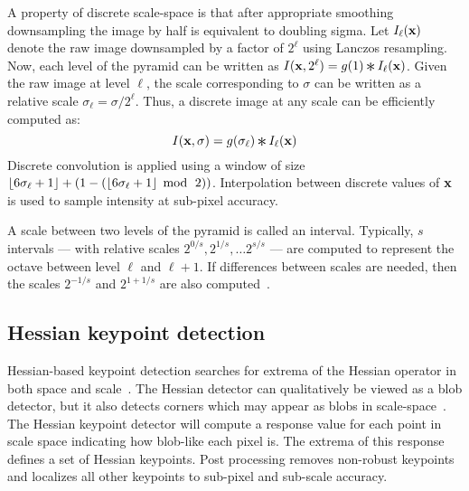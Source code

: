             A property of discrete scale-space is that after appropriate smoothing downsampling the image by half
            is equivalent to doubling sigma. Let
            $I_\ell(\mathbf{x})$ %
            denote the raw image downsampled by a factor of $2^{\ell}$ using Lanczos resampling. Now, each level of
            the pyramid can be written as %
            $\img(\pt, 2^\ell) = g( 1 ) \conv \img_\ell(\pt)$. 
            Given the raw image at level $\ell$, the scale
            corresponding to $\sigma$ can be written as a relative scale
            $\sigma_\ell = \sigma / 2^\ell$.
            Thus, a discrete image at any scale can be efficiently computed as:
            \begin{equation}
                \img(\pt, \sigma) =
                    g(\sigma_\ell) \conv \img_\ell(\pt)
            \end{equation}
            Discrete convolution is applied using a window of size
              $\left\lfloor{} 6\sigma_\ell + 1 \right\rfloor + (1 -
              (\left\lfloor{} 6\sigma_\ell + 1 \right\rfloor\; \operatorname{mod}{} \;\,2))$.
            Interpolation between discrete values of $\mathbf{x}$ is used to
              sample intensity at sub-pixel accuracy.

            A scale between two levels of the pyramid is called an interval. Typically, $s$ intervals --- with
            relative scales $2^{0/s}, 2^{1/s}, \ldots 2^{s/s}$ --- are computed to represent the octave between
            level $\ell$ and $\ell + 1$. If differences between scales are needed, then the scales $2^{-1/s}$ and
            $2^{1 + 1/s}$ are also computed~\cite{lowe_distinctive_2004}.

    \subsection{Hessian keypoint detection}

        Hessian-based keypoint detection searches for extrema of the Hessian operator in both space and
        scale~\cite{beaudet_rotationally_1978, lindeberg_shape_adapted_1994}. The Hessian detector can
        qualitatively be viewed as a blob detector, but it also detects corners which may appear as blobs in
        scale-space~\cite{tuytelaars_local_2007}. The Hessian keypoint detector will compute a response value for
        each point in scale space indicating how blob-like each pixel is. The extrema of this response defines a
        set of Hessian keypoints. Post processing removes non-robust keypoints and localizes all other keypoints to
        sub-pixel and sub-scale accuracy.

